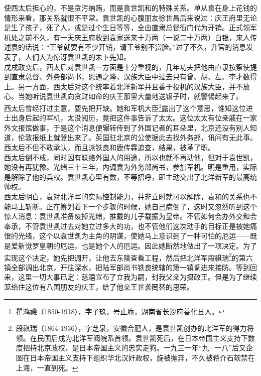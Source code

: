 使西太后担心的，不是贪污纳贿，而是袁世凯和的特殊关系。单从袁在身上花钱的情形来看，那关系就很不平常。袁世凯的心腹朋友徐世昌后来说过：庆王府里无论是生了孩子，死了人，或是过个生日等等，全由直隶总督衙门代为开销。正式领军机处之前不久，有一天庆王府收到袁家送来十万两（一说二十万两）白银，来人传述袁的话说：“王爷就要有不少开销，请王爷别不赏脸。”过了不久，升官的消息发表了，人们大为惊讶袁世凯的未卜先知。\\

戊戌政变后，西太后对袁世凯一方面是十分重视的，几年功夫把他由直隶按察使提到直隶总督、外务部尚书，恩遇之隆，汉族大臣中过去只有曾、胡、左、李才数得上。另一方面，西太后对这个统率着北洋新军并且善于投机的汉族大臣，并不放心。当她听说袁世凯向贪财如命的庆王那里大量地送银子时，就警惕起来了。\\

西太后曾经打过主意，要先把开缺。她和军机大臣\footnote{瞿鸿禨（1850-1918），字子玖，号止庵，湖南省长沙府善化县人。}露出了这个意思，谁知这位进士出身后起的军机，太没阅历，竟把这件事告诉了太太。这位太太有位亲戚在一家外文报馆做事，于是这个消息便辗转传到了外国记者的耳朵里，北京还没有别人知道，伦敦报纸上就登出来了。英国驻北京的公使据此去找外务部，讯问有无此事。西太后不但不敢承认，而且派铁良和鹿传霖追查，结果，被革了职。\\

西太后倒不成，同时因有联络外国人的用途，所以也就不再动他，但对于袁世凯，她没有再犹豫。光绪三十三年，内调袁为外务部尚书，参加军机。明是重用，实际是解除了他的兵权。袁世凯心里有数，不等招呼，即主动交出了北洋新军的最高统帅权。\\

西太后明白，袁对北洋军的实际控制能力，并非立时就可以解除，袁和的关系也不能马上斩断。正在筹划着下一个步骤的时候，她自己病倒了，这时又忽然听到这个惊人消息：袁世凯准备废掉光绪，推戴的儿子载振为皇帝。不管如何会办外交和会奉承，不管袁世凯过去对她立过多大的功，也不管他们这次动手的目标正是被她痛恨的光绪，这个以袁世凯为主角的阴谋，使她马上意识到了一种可怕的厄运——既是爱新觉罗皇朝的厄运，也是她个人的厄运。因此她断然地做出了一项决定。为了实现这个决定，她先把调开，让他去东陵查看工程，然后把北洋军段祺瑞\footnote{段祺瑞（1864-1936），字芝泉，安徽合肥人，是袁世凯创办的北洋军的得力将领。在民国后成为北洋军阀皖系首领。袁世凯死后，在日本帝国主义支持下数度把持北京政权，是日本帝国主义的忠实走狗。一九三一年“九·一八”后又企图在日本帝国主义支持下组织华北汉奸政权，旋被抛弃，不久被蒋介石软禁在上海，一直到死。}的第六镇全部调出北京，开往深水，把陆军部尚书铁良统辖的第一镇调进来接防。等到回来，这里一切大事已定：慈禧宣布了立我为嗣，封我父亲为摄政王。但是为了继续笼络住这位有八国朋友的庆王，给了他亲王世袭罔替的思荣。\\

